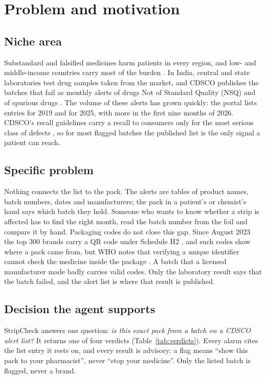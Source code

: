 \section{Problem and motivation}
\label{sec:problem}

\subsection{Niche area}
Substandard and falsified medicines harm patients in every region, and low- and middle-income countries carry most of the burden \cite{who2017oneinten,ozawa2018prevalence}. In India, central and state laboratories test drug samples taken from the market, and CDSCO publishes the batches that fail as monthly alerts of drugs Not of Standard Quality (NSQ) and of spurious drugs \cite{cdsco2026portal}. The volume of these alerts has grown quickly: the portal lists \RowsYearFirst{} entries for 2019 and \RowsYearTwentyFive{} for 2025, with \RowsYearTwentySix{} more in the first nine months of 2026. CDSCO's recall guidelines carry a recall to consumers only for the most serious class of defects \cite{cdsco2024recall}, so for most flagged batches the published list is the only signal a patient can reach.

\subsection{Specific problem}
Nothing connects the list to the pack. The alerts are tables of product names, batch numbers, dates and manufacturers; the pack in a patient's or chemist's hand says which batch they hold. Someone who wants to know whether a strip is affected has to find the right month, read the batch number from the foil and compare it by hand. Packaging codes do not close this gap. Since August 2023 the top 300 brands carry a QR code under Schedule H2 \cite{cdsco2023faqqr}, and such codes show where a pack came from, but WHO notes that verifying a unique identifier cannot check the medicine inside the package \cite{who2021traceability}. A batch that a licensed manufacturer made badly carries valid codes. Only the laboratory result says that the batch failed, and the alert list is where that result is published.

\subsection{Decision the agent supports}
StripCheck answers one question: \emph{is this exact pack from a batch on a CDSCO alert list?} It returns one of four verdicts (Table~\ref{tab:verdicts}). Every alarm cites the list entry it rests on, and every result is advisory: a flag means ``show this pack to your pharmacist'', never ``stop your medicine''. Only the listed batch is flagged, never a brand.

